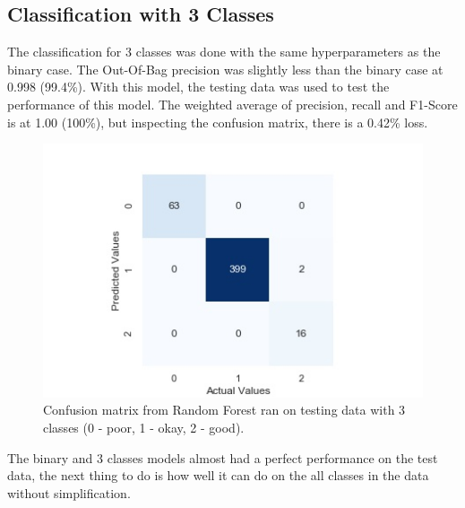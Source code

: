 \documentclass[11pt,a4paper,titlepage]{article}
\begin{document}
	\subsection{Classification with 3 Classes}
	The classification for 3 classes was done with the same hyperparameters as the binary case. The Out-Of-Bag precision was slightly less than the binary case at 0.998 (99.4\%). With this model, the testing data was used to test the performance of this model. The weighted average of precision, recall and F1-Score is at 1.00 (100\%), but inspecting the confusion matrix, there is a 0.42\% loss. 
	\begin{figure}[H]
		\centering
		\includegraphics[scale=0.6]{img/threeclass_rf.jpg}
		\caption{Confusion matrix from Random Forest ran on testing data with 3 classes (0 - poor, 1 - okay, 2 - good).}
	\end{figure}
	\noindent The binary and 3 classes models almost had a perfect performance on the test data, the next thing to do is how well it can do on the all classes in the data without simplification. 
\end{document}
